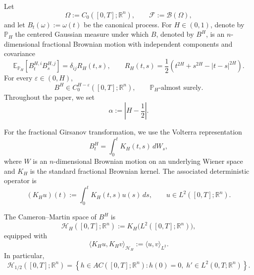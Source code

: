 \documentclass[preprint,12pt]{elsarticle}
\theoremstyle{definition}
\theoremstyle{plain}
\begin{document}
Let
\begin{equation*}
    \Omega:=C_0([0,T];\mathbb R^n),
    \qquad
    \mathcal F:=\mathcal B(\Omega),
\end{equation*}
and let $B_t(\omega):=\omega(t)$ be the canonical process. For
$H\in(0,1)$, denote by $\mathbb P_H$ the centered Gaussian measure under
which $B$, denoted by $B^H$, is an $n$-dimensional fractional Brownian
motion with independent components and covariance
\begin{equation*}
    \mathbb E_{\mathbb P_H}
    \left[
        B_t^{H,i}B_s^{H,j}
    \right]
    =
    \delta_{ij}R_H(t,s),
    \qquad
    R_H(t,s)
    =
    \frac12
    \left(
        t^{2H}+s^{2H}-|t-s|^{2H}
    \right).
\end{equation*}
For every $\varepsilon\in(0,H)$,
\begin{equation*}
    B^H\in
    C_0^{H-\varepsilon}([0,T];\mathbb R^n),
    \qquad
    \mathbb P_H\text{-almost surely}.
\end{equation*}
Throughout the paper, we set
\begin{equation*}
    \alpha:=\left|H-\frac12\right|.
\end{equation*}

For the fractional Girsanov transformation, we use the Volterra
representation
\begin{equation*}
    B_t^H
    =
    \int_0^t K_H(t,s)\,dW_s,
\end{equation*}
where $W$ is an $n$-dimensional Brownian motion on an underlying Wiener
space and $K_H$ is the standard fractional Brownian kernel. The associated
deterministic operator is
\begin{equation}
\label{kh_operator}
    (K_Hu)(t)
    :=
    \int_0^t K_H(t,s)u(s)\,ds,
    \qquad
    u\in L^2([0,T];\mathbb R^n).
\end{equation}

The Cameron--Martin space of $B^H$ is
\begin{equation*}
    \mathcal H_H([0,T];\mathbb R^n)
    :=
    K_H\bigl(L^2([0,T];\mathbb R^n)\bigr),
\end{equation*}
equipped with
\begin{equation*}
    \langle K_Hu,K_Hv\rangle_{\mathcal H_H}
    :=
    \langle u,v\rangle_{L^2}.
\end{equation*}
In particular,
\begin{equation*}
    \mathcal H_{1/2}([0,T];\mathbb R^n)
    =
    \left\{
        h\in AC([0,T];\mathbb R^n):
        h(0)=0,\;
        h'\in L^2(0,T;\mathbb R^n)
    \right\}.
\end{equation*}
\end{document}
